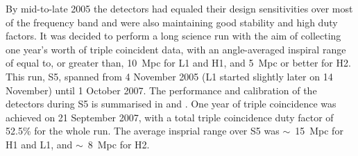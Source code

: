 By mid-to-late 2005 the detectors had equaled their design sensitivities over most of the frequency band and 
were also maintaining good stability and high duty factors. It was decided to perform a long science run with 
the aim of collecting one year's worth of triple coincident data, with an angle-averaged inspiral range of 
equal to, or greater than, 10~Mpc for L1 and H1, and 5~Mpc or better for H2. This run, S5, spanned from 4 
November 2005 (L1 started slightly later on 14 November) until 1 October 2007. The performance and 
calibration of the detectors during S5 is summarised in \cite{LIGOS5} and \cite{2010NIMPA.624..223A}. One year 
of triple coincidence was achieved on 21 September 2007, with a total triple coincidence duty factor of 52.5\% 
for the whole run. The average insprial range over S5 was $\sim$~15~Mpc for H1 and L1, and $\sim$~8~Mpc for 
H2.

